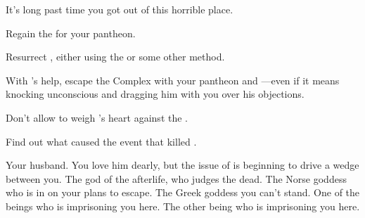 \documentclass[char]{guardians}
\begin{document}
It's long past time you got out of this horrible place.

\begin{itemz}[Goals]
  \item Regain the \iNecro{} for your pantheon.
  \item Resurrect \cSet{}, either using the \iNecro{\MYname} or some other method.
  \item With \cSet{}'s help, escape the Complex with your pantheon and \cHel{}---even if it means knocking \cOsiris{} unconscious and dragging him with you over his objections.
  \item Don't allow \cAnubis{} to weigh \cEgyptianHuman{}'s heart against the \iFeather{\MYname}.
  \item Find out what caused the event that killed \cEgyptianHuman{}.
\end{itemz}

\begin{contacts}
  \contact{\cOsiris{}} Your husband. You love him dearly, but the issue of \cSet{} is beginning to drive a wedge between you.
  \contact{\cAnubis{}} The god of the afterlife, who judges the dead.
  \contact{\cHel{}} The Norse goddess who is in on your plans to escape.
  \contact{\cHera{}} The Greek goddess you can't stand.
  \contact{\cCaretaker{}} One of the beings who is imprisoning you here.
  \contact{\cWarden{}} The other being who is imprisoning you here.
\end{contacts}
\end{document}
